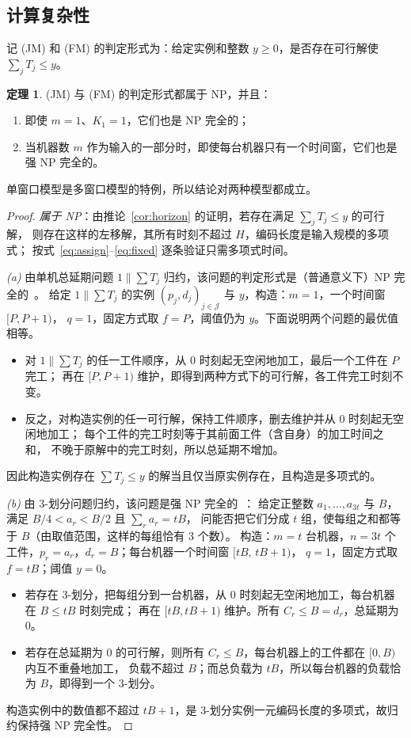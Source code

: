 \documentclass[11pt,oneside,notitlepage]{ctexrep}
\theoremstyle{definition}
\newtheorem{theorem}[definition]{定理}
\theoremstyle{remark}
\newcommand{\cJ}{\mathcal{J}}
\begin{document}
\subsection{计算复杂性}

记 (JM) 和 (FM) 的判定形式为：给定实例和整数 $y\ge 0$，是否存在可行解使 $\sum_j T_j\le y$。

\begin{theorem}\label{thm:np}
(JM) 与 (FM) 的判定形式都属于 NP，并且：
\begin{enumerate}[label=(\alph*),nosep]
  \item 即使 $m=1$、$K_1=1$，它们也是 NP 完全的；
  \item 当机器数 $m$ 作为输入的一部分时，即使每台机器只有一个时间窗，它们也是强 NP 完全的。
\end{enumerate}
单窗口模型是多窗口模型的特例，所以结论对两种模型都成立。
\end{theorem}

\begin{proof}
\emph{属于 NP}：由推论~\ref{cor:horizon} 的证明，若存在满足 $\sum_jT_j\le y$ 的可行解，
则存在这样的左移解，其所有时刻不超过 $H$，编码长度是输入规模的多项式；
按式~\eqref{eq:assign}--\eqref{eq:fixed} 逐条验证只需多项式时间。

\emph{(a)} 由单机总延期问题 $1\|\sum T_j$ 归约，该问题的判定形式是（普通意义下）NP 完全的~\cite{du1990}。
给定 $1\|\sum T_j$ 的实例 $(p_j,d_j)_{j\in\cJ}$ 与 $y$，构造：$m=1$，一个时间窗 $[P,P+1)$，
$q=1$，固定方式取 $f=P$，阈值仍为 $y$。下面说明两个问题的最优值相等。
\begin{itemize}[nosep]
  \item 对 $1\|\sum T_j$ 的任一工件顺序，从 0 时刻起无空闲地加工，最后一个工件在 $P$ 完工；
        再在 $[P,P+1)$ 维护，即得到两种方式下的可行解，各工件完工时刻不变。
  \item 反之，对构造实例的任一可行解，保持工件顺序，删去维护并从 0 时刻起无空闲地加工；
        每个工件的完工时刻等于其前面工件（含自身）的加工时间之和，
        不晚于原解中的完工时刻，所以总延期不增加。
\end{itemize}
因此构造实例存在 $\sum T_j\le y$ 的解当且仅当原实例存在，且构造是多项式的。

\emph{(b)} 由 3-划分问题归约，该问题是强 NP 完全的~\cite{garey1979}：
给定正整数 $a_1,\dots,a_{3t}$ 与 $B$，满足 $B/4<a_r<B/2$ 且 $\sum_ra_r=tB$，
问能否把它们分成 $t$ 组，使每组之和都等于 $B$（由取值范围，这样的每组恰有 3 个数）。
构造：$m=t$ 台机器，$n=3t$ 个工件，$p_r=a_r$，$d_r=B$；每台机器一个时间窗 $[tB,\,tB+1)$，
$q=1$，固定方式取 $f=tB$；阈值 $y=0$。
\begin{itemize}[nosep]
  \item 若存在 3-划分，把每组分到一台机器，从 0 时刻起无空闲地加工，每台机器在 $B\le tB$ 时刻完成；
        再在 $[tB,tB+1)$ 维护。所有 $C_r\le B=d_r$，总延期为 0。
  \item 若存在总延期为 0 的可行解，则所有 $C_r\le B$，每台机器上的工件都在 $[0,B)$ 内互不重叠地加工，
        负载不超过 $B$；而总负载为 $tB$，所以每台机器的负载恰为 $B$，即得到一个 3-划分。
\end{itemize}
构造实例中的数值都不超过 $tB+1$，是 3-划分实例一元编码长度的多项式，故归约保持强 NP 完全性。
\end{proof}
\end{document}
